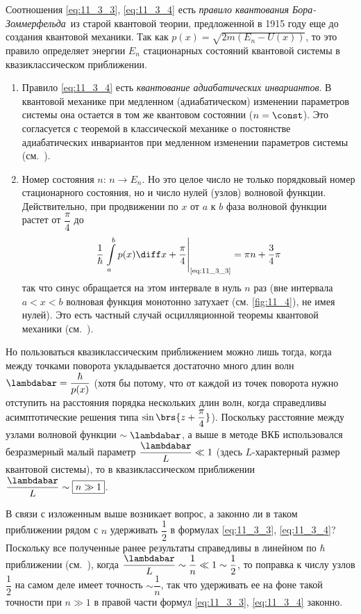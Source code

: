 Соотношения \eqref{eq:11_3_3}, \eqref{eq:11_3_4} есть {\em правило квантования Бора-Зоммерфельда}\footnotemark\ из старой квантовой теории, предложенной в 1915 году еще до создания квантовой механики. Так как $p(x) = \sqrt{2m(E_n - U(x))}$, то это правило определяет энергии $E_n$ стационарных состояний квантовой системы в квазиклассическом приближении.

\begin{enumerate}
\item Правило \eqref{eq:11_3_4} есть {\em квантование адиабатических инвариантов}. В квантовой механике при медленном (адиабатическом) изменении параметров системы она остается в том же квантовом состоянии (${n = \const}$). Это согласуется с теоремой в классической механике о постоянстве адиабатических инвариантов при медленном изменении параметров системы (см.~).

\item Номер состояния $n$: $n \to E_n$. Но это целое число не только порядковый номер стационарного состояния, но и число нулей (узлов) волновой функции. Действительно, при продвижении по $x$ от $a$ к $b$ фаза волновой функции растет от $\dfrac{\pi}{4}$ до
$$
\frac{1}{\hbar} \left. \int \limits_{a}^{b} p(x) \diff x + \frac{\pi}{4} \right|_{\text{\eqref{eq:11_3_3}}} =\pi n + \frac{3}{4}\pi
$$%
%
так что синус обращается на этом интервале в нуль $n$ раз (вне интервала $a < x < b$ волновая функция монотонно затухает (см. \autoref{fig:11_4}), не имея нулей). Это есть частный случай осцилляционной теоремы квантовой механики (см.~).
\end{enumerate}

Но пользоваться квазиклассическим приближением можно лишь тогда, когда между точками поворота укладывается достаточно много длин волн $\lambdabar = \dfrac{\hbar}{p(x)}$ (хотя бы потому, что от каждой из точек поворота нужно отступить на расстояния порядка нескольких длин волн, когда справедливы асимптотические решения типа $\sin \brs{z + \dfrac{\pi}{4}}$). Поскольку расстояние между узлами волновой функции $\sim \lambdabar$, а выше в методе ВКБ использовался безразмерный малый параметр $\dfrac{\lambdabar}{L} \ll 1$ (здесь $L$-характерный размер квантовой системы), то в квазиклассическом приближении $\dfrac{\lambdabar}{L} \sim \boxed{n \gg 1}$.

В связи с изложенным выше возникает вопрос, а законно ли в таком приближении рядом с $n$ удерживать $\dfrac{1}{2}$ в формулах \eqref{eq:11_3_3}, \eqref{eq:11_3_4}? Поскольку все полученные ранее результаты справедливы в линейном по $\hbar$ приближении (см.~), когда $\dfrac{\lambdabar}{L} \sim \dfrac{1}{n} \ll 1 \sim \dfrac{1}{2}$, то поправка к числу узлов $\dfrac{1}{2}$ на самом деле имеет точность $\sim \dfrac{1}{n}$, так что удерживать ее на фоне такой точности при $n \gg 1$ в правой части формул \eqref{eq:11_3_3}, \eqref{eq:11_3_4} законно.

